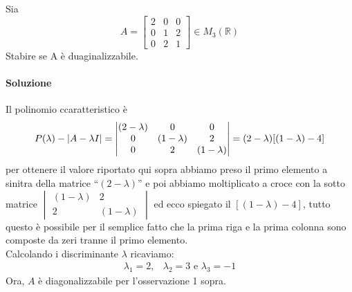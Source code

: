 \begin{esempio}
  Sia
  \begin{equation}
    \label{eq:critDiag7}
    A=
    \begin{bmatrix}
      2 & 0 & 0 \\
      0 & 1 & 2 \\
      0 & 2 & 1
    \end{bmatrix} \in M_3(\mathds{R})
  \end{equation}
  Stabire se A è duaginalizzabile.
  
\paragraph{Soluzione}

Il polinomio ccaratteristico è
\begin{eqnarray*}
  P(\lambda)-\lvert A-\lambda I\rvert=
  \begin{vmatrix}
    (2-\lambda) & 0 & 0\\
    0 & (1-\lambda) & 2\\
    0 & 2 & (1-\lambda)
  \end{vmatrix} = (2-\lambda)[(1-\lambda)-4]
\end{eqnarray*}
per ottenere il valore riportato qui sopra abbiamo preso il primo elemento
a sinitra della matrice ``$(2-\lambda)$'' e poi abbiamo moltiplicato a croce
con la sotto matrice $
\begin{vmatrix}
   (1-\lambda) & 2\\
   2 & (1-\lambda)
\end{vmatrix}
$ ed ecco spiegato il $[(1-\lambda)-4]$, tutto questo è possibile per il semplice fatto che la prima riga e la prima colonna sono composte da zeri tranne il primo elemento.\\
Calcolando i discriminante $\lambda$ ricaviamo:
\begin{eqnarray*}
  \lambda_1=2, & \lambda_2=3 \text{ e } \lambda_3=-1
\end{eqnarray*}
Ora, $A$ è diagonalizzabile per l'osservazione 1 sopra.
\end{esempio}
